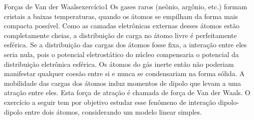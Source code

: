 \begin{exercício}{Forças de Van der Waals}{exercício1}
    Os gases raros (neônio, argônio, etc.) formam cristais a baixas temperaturas, quando os átomos se empilham da forma mais compacta possível. Como as camadas eletrônicas externas desses átomos estão completamente cheias, a distribuição de carga no átomo livre é perfeitamente esférica. Se a distribuição das cargas dos átomos fosse fixa, a interação entre eles seria nula, pois o potencial eletrostático do núcleo compensaria o potencial da distribuição eletrônica esférica. Os átomos do gás inerte então não poderiam manifestar qualquer coesão entre si e nunca se condensariam na forma sólida. A mobilidade das cargas dos átomos induz momentos de dipolo que levam a uma atração entre eles. Esta força de atração é chamada de força de Van der Waals. O exercício a seguir tem por objetivo estudar esse fenômeno de interação dipolo-dipolo entre dois átomos, considerando um modelo linear simples.


\end{exercício}
